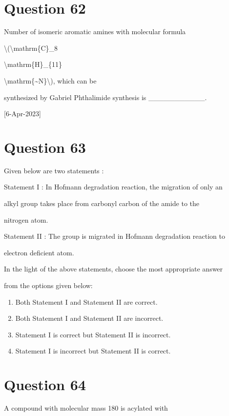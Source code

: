 \documentclass{article}
\begin{document}
\section*{Question 62}
Number of isomeric aromatic amines with molecular formula

\textbackslash(\textbackslash mathrm\{C\}\_8

\textbackslash mathrm\{H\}\_\{11\}

\textbackslash mathrm\{\textasciitilde N\}\textbackslash), which can be

synthesized by Gabriel Phthalimide synthesis is \_\_\_\_\_\_\_\_\_\_\_.~

{[}6-Apr-2023{]}


\begin{enumerate}[label=(\alph*)]
\end{enumerate}
\newpage
\section*{Question 63}
Given below are two statements :



Statement I : In Hofmann degradation reaction, the migration of only an

alkyl group takes place from carbonyl carbon of the amide to the

nitrogen atom.



Statement II : The group is migrated in Hofmann degradation reaction to

electron deficient atom.



In the light of the above statements, choose the most appropriate answer

from the options given below:


\begin{enumerate}[label=(\alph*)]
\item Both Statement I and Statement II are correct.


\item Both Statement I and Statement II are incorrect.


\item Statement I is correct but Statement II is incorrect.


\item Statement I is incorrect but Statement II is correct.


\end{enumerate}
\newpage
\section*{Question 64}
A compound with molecular mass 180 is acylated with
\end{document}
